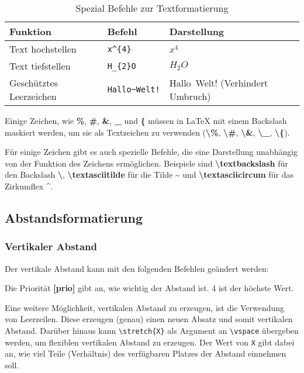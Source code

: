 \begin{table}[H]
    \centering
    \begin{tabular}{lll}
        \toprule
        \textbf{Funktion}       & \textbf{Befehl}                     & \textbf{Darstellung}             \\
        \midrule
        Text hochstellen        & \texttt{x\textasciicircum\{4\}}     & $x^{4}$                          \\
        Text tiefstellen        & \texttt{H\_\{2\}O}                  & $H_{2}O$                         \\
        Geschütztes Leerzeichen & \texttt{Hallo\textasciitilde Welt!} & Hallo~Welt! (Verhindert Umbruch) \\
        \bottomrule
    \end{tabular}
    \caption{Spezial Befehle zur Textformatierung}
    \label{tab:textformatierung}
\end{table}

Einige Zeichen, wie \textbf{\%}, \textbf{\#}, \textbf{\&}, \textbf{\_} und \textbf{\{} müssen in \LaTeX{} mit einem Backslash maskiert werden, um sie als Textzeichen zu verwenden (\textbf{\textbackslash\%}, \textbf{\textbackslash\#}, \textbf{\textbackslash\&}, \textbf{\textbackslash\_}, \textbf{\textbackslash\{}).

Für einige Zeichen gibt es auch spezielle Befehle, die eine Darstellung unabhängig von der Funktion des Zeichens ermöglichen. Beispiele sind \textbf{\textbackslash textbackslash} für den Backslash \textbf{\textbackslash}, \textbf{\textbackslash textasciitilde} für die Tilde \textbf{\textasciitilde} und \textbf{\textbackslash textasciicircum} für das Zirkumflex \textbf{\textasciicircum}.

\subsection{Abstandsformatierung}
\subsubsection{Vertikaler Abstand}
Der vertikale Abstand kann mit den folgenden Befehlen geändert werden:



Die Priorität \textbf{[prio]} gibt an, wie wichtig der Abstand ist. 4 ist der höchste Wert.

Eine weitere Möglichkeit, vertikalen Abstand zu erzeugen, ist die Verwendung von Leerzeilen. Diese erzeugen (genau) einen neuen Absatz und somit vertikalen Abstand.
Darüber hinaus kann \texttt{\textbackslash stretch\{X\}} als Argument an \texttt{\textbackslash vspace} übergeben werden, um flexiblen vertikalen Abstand zu erzeugen. Der Wert von \texttt{X} gibt dabei an, wie viel Teile (Verhältnis) des verfügbaren Platzes der Abstand einnehmen soll.

